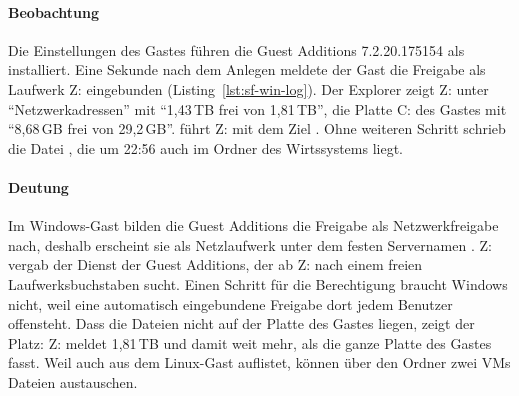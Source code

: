 \begin{messung}




\paragraph{Beobachtung} Die Einstellungen des Gastes führen die Guest Additions 7.2.20.175154 als installiert. Eine Sekunde nach dem Anlegen meldete der Gast die Freigabe als Laufwerk Z: eingebunden (Listing~\ref{lst:sf-win-log}). Der Explorer zeigt Z: unter \enquote{Netzwerkadressen} mit \enquote{1,43\,TB frei von 1,81\,TB}, die Platte C: des Gastes mit \enquote{8,68\,GB frei von 29,2\,GB}.  führt Z: mit dem Ziel . Ohne weiteren Schritt schrieb  die Datei , die um 22:56 auch im Ordner des Wirtssystems liegt.
\paragraph{Deutung} Im Windows-Gast bilden die Guest Additions die Freigabe als Netzwerkfreigabe nach, deshalb erscheint sie als Netzlaufwerk unter dem festen Servernamen . Z: vergab der Dienst der Guest Additions, der ab Z: nach einem freien Laufwerksbuchstaben sucht. Einen Schritt für die Berechtigung braucht Windows nicht, weil eine automatisch eingebundene Freigabe dort jedem Benutzer offensteht. Dass die Dateien nicht auf der Platte des Gastes liegen, zeigt der Platz: Z: meldet 1,81\,TB und damit weit mehr, als die ganze Platte des Gastes fasst. Weil  auch  aus dem Linux-Gast auflistet, können über den Ordner zwei VMs Dateien austauschen.
\end{messung}

